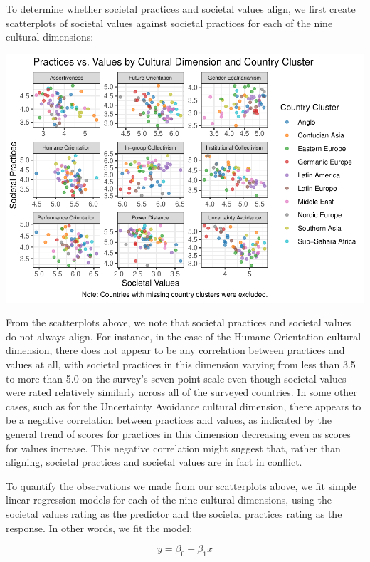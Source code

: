 \documentclass[
]{article}
\begin{document}
To determine whether societal practices and societal values align, we
first create scatterplots of societal values against societal practices
for each of the nine cultural dimensions:

\begin{center}\includegraphics[width=0.85\linewidth]{final_report_files/figure-latex/SPV Plots-1} \end{center}

From the scatterplots above, we note that societal practices and
societal values do not always align. For instance, in the case of the
Humane Orientation cultural dimension, there does not appear to be any
correlation between practices and values at all, with societal practices
in this dimension varying from less than 3.5 to more than 5.0 on the
survey's seven-point scale even though societal values were rated
relatively similarly across all of the surveyed countries. In some other
cases, such as for the Uncertainty Avoidance cultural dimension, there
appears to be a negative correlation between practices and values, as
indicated by the general trend of scores for practices in this dimension
decreasing even as scores for values increase. This negative correlation
might suggest that, rather than aligning, societal practices and
societal values are in fact in conflict.

To quantify the observations we made from our scatterplots above, we fit
simple linear regression models for each of the nine cultural
dimensions, using the societal values rating as the predictor and the
societal practices rating as the response. In other words, we fit the
model:

\[
y = \beta_0 + \beta_1 x
\]
\end{document}
